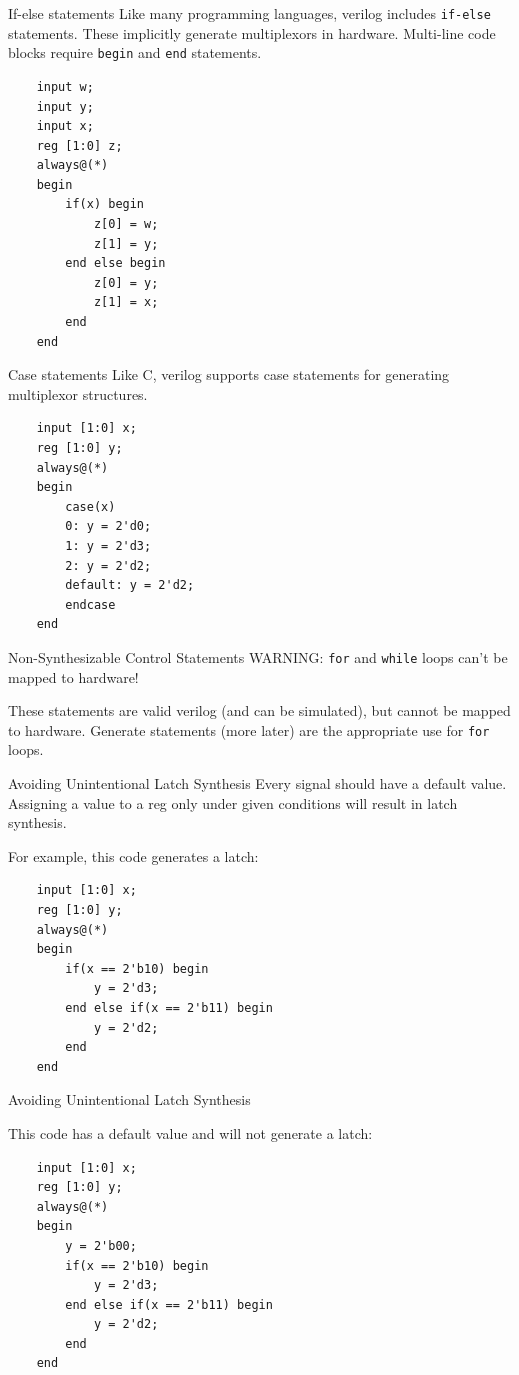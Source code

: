 \documentclass{beamer}
\begin{document}
\begin{frame}[fragile]{If-else statements}
	Like many programming languages, verilog includes \texttt{if-else} statements.
	These implicitly generate multiplexors in hardware.
	Multi-line code blocks require \texttt{begin} and \texttt{end} statements.

\begin{verbatim}
	input w;
	input y;
	input x;
	reg [1:0] z;
	always@(*)
	begin
		if(x) begin
			z[0] = w;
			z[1] = y;
		end else begin
			z[0] = y;
			z[1] = x;
		end
	end
\end{verbatim}

\end{frame}

\begin{frame}[fragile]{Case statements}
	Like C, verilog supports case statements for generating multiplexor structures.

\begin{verbatim}
	input [1:0] x;
	reg [1:0] y;
	always@(*)
	begin
		case(x)
		0: y = 2'd0;
		1: y = 2'd3;
		2: y = 2'd2;
		default: y = 2'd2;
		endcase
	end
\end{verbatim}

\end{frame}

\begin{frame}[fragile]{Non-Synthesizable Control Statements}
	WARNING: \texttt{for} and \texttt{while} loops can't be mapped to hardware!

	These statements are valid verilog (and can be simulated), but cannot be mapped to hardware.
	Generate statements (more later) are the appropriate use for \texttt{for} loops.
\end{frame}

\begin{frame}[fragile]{Avoiding Unintentional Latch Synthesis}
	Every signal should have a default value.
	Assigning a value to a reg only under given conditions will result in latch synthesis.

	For example, this code generates a latch:

\begin{verbatim}
	input [1:0] x;
	reg [1:0] y;
	always@(*)
	begin
		if(x == 2'b10) begin
			y = 2'd3;
		end else if(x == 2'b11) begin
			y = 2'd2;
		end
	end
\end{verbatim}

\end{frame}

\begin{frame}[fragile]{Avoiding Unintentional Latch Synthesis}

	This code has a default value and will not generate a latch:

\begin{verbatim}
	input [1:0] x;
	reg [1:0] y;
	always@(*)
	begin
		y = 2'b00;
		if(x == 2'b10) begin
			y = 2'd3;
		end else if(x == 2'b11) begin
			y = 2'd2;
		end
	end
\end{verbatim}

\end{frame}
\end{document}
